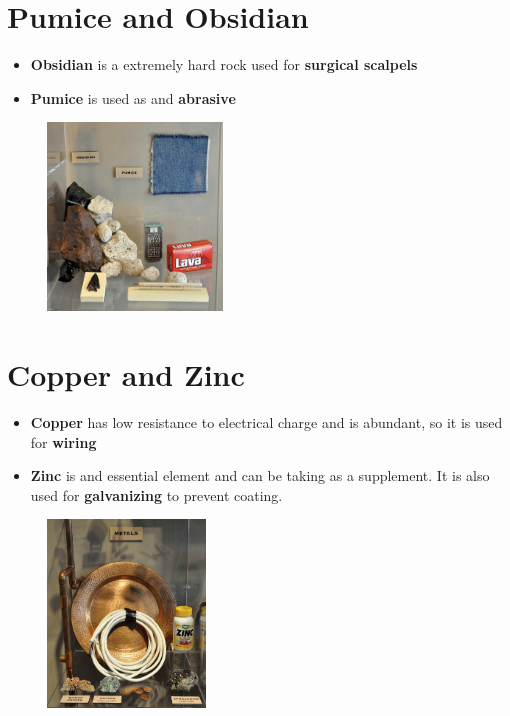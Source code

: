 \documentclass[12pt, letterpaper]{article}
\begin{document}
	
\section{Pumice and Obsidian}

	\begin{itemize}
		\item \textbf{Obsidian} is a extremely hard rock used for \textbf{surgical scalpels}
		\item \textbf{Pumice} is used as and \textbf{abrasive}
	\end{itemize}
	
	\begin{figure}[h]
		\includegraphics[height=5cm]{shelf06}
		\centering
	\end{figure}
	
\section{Copper and Zinc}

	\begin{itemize}
		\item \textbf{Copper} has low resistance to electrical charge and is abundant, so it is used for \textbf{wiring}
		\item \textbf{Zinc} is and essential element and can be taking as a supplement. It is also used for \textbf{galvanizing} to prevent coating.
	\end{itemize}
	
	\begin{figure}[h]
		\includegraphics[height=5cm]{shelf07_0}
		\centering
	\end{figure}
\end{document}
